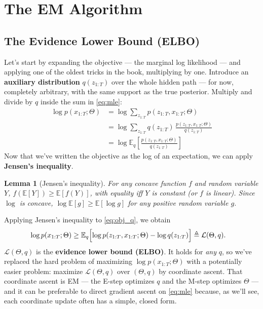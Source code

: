 \documentclass[11pt]{article}
\newcommand{\E}{\mathbb{E}}
\newtheorem*{lemma*}{Lemma}
\begin{document}
\section{The EM Algorithm}

\subsection{The Evidence Lower Bound (ELBO)}

Let's start by expanding the objective --- the marginal log likelihood --- and applying 
one of the oldest tricks in the book, multiplying by one. 
Introduce an \textbf{auxiliary distribution} $q(z_{1:T})$ over the whole
hidden path --- for now, completely arbitrary, with the same support as the
true posterior. Multiply and divide by $q$ inside the sum in
\eqref{eq:mle}:
\begin{align}
\log p(x_{1:T}; \Theta) 
&= \log \sum_{z_{1:T}} p(z_{1:T}, x_{1:T}; \Theta) \nonumber \\
&= \log \sum_{z_{1:T}} q(z_{1:T}) \, \frac{p(z_{1:T}, x_{1:T}; \Theta)}{q(z_{1:T})} \nonumber  \\
&= \log \E_q\!\left[\frac{p(z_{1:T}, x_{1:T}; \Theta)}{q(z_{1:T})}\right] \label{eq:obj_q}
\end{align}
Now that we've written the objective as the log of an expectation, we can apply \textbf{Jensen's inequality}.

\begin{lemma*}[Jensen's inequality]
For any concave function $f$ and random variable $Y$,
$f(\E[Y]) \geq \E[f(Y)]$, with equality iff $Y$ is constant (or $f$ is
linear). Since $\log$ is concave, $\log \E[g] \geq \E[\log g]$ for any
positive random variable $g$.
\end{lemma*}

Applying Jensen's inequality to \eqref{eq:obj_q}, we obtain
\begin{align}
\log p(x_{1:T}; \Theta) 
  &\geq \E_q\Bigl[\log p(z_{1:T}, x_{1:T}; \Theta) - \log q(z_{1:T})\Bigr] 
\triangleq \mathcal{L}(\Theta, q).
\label{eq:elbo-def}
\end{align}
$\mathcal{L}(\Theta,q)$ is the \textbf{evidence lower bound (ELBO)}. It holds
for \emph{any} $q$, so we've replaced the hard problem of maximizing
$\log p(x_{1:T};\Theta)$ with a potentially easier problem:
maximize $\mathcal{L}(\Theta,q)$ over $(\Theta, q)$ by coordinate ascent.
That coordinate ascent is EM --- the E-step optimizes $q$ and the M-step optimizes
$\Theta$ --- and it can be preferable to direct gradient ascent on
\eqref{eq:mle} because, as we'll see, each coordinate update often has a simple,
closed form.
\end{document}
